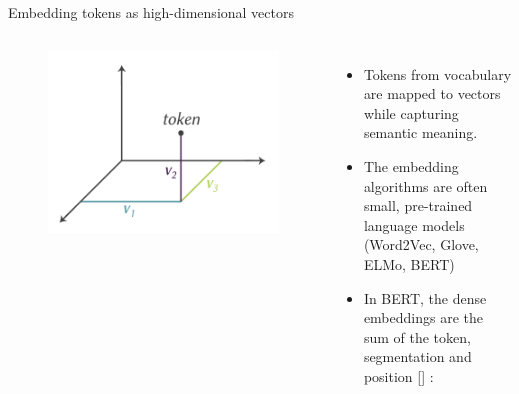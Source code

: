 \documentclass[10pt]{beamer}
\newcommand{\citeme}[1]{{\xspace\color{scAqua} \scriptsize [\cite{#1}]}}
\begin{document}
\begin{frame}{Embedding tokens as high-dimensional vectors}
	\begin{columns}[T,onlytextwidth]
		\hspace*{-0.7cm} 
		\begin{figure}
			\includegraphics[width=\textwidth]{figures/3D_word_to_vec.png}
		\end{figure}
		\vspace{0.7cm}
		\begin{itemize}
			\item Tokens from vocabulary are mapped to vectors while capturing semantic meaning. 
			\item The embedding algorithms are often small, pre-trained language models (Word2Vec, Glove, ELMo, BERT)
			\item In BERT, the dense embeddings are the sum of the token, segmentation and position\citeme{Devlin2018} \vspace{0.4cm}:

\end{itemize}
\end{columns}
\end{frame}
\end{document}
